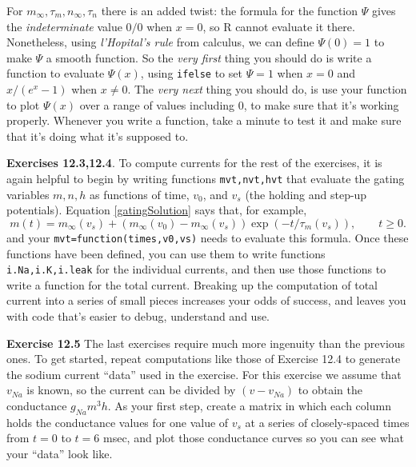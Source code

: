 \documentclass [11pt]{article}
\newcommand{\be}{\begin{equation}}
\newcommand{\ee}{\end{equation}}
\newcounter{exercise}
\numberwithin{exercise}{section}
\def\R{R }
\begin{document}
For $m_\infty,\tau_m,n_\infty,\tau_n$ there is an added twist: 
the formula for the function $\Psi$ gives the  
{\it indeterminate} value $0/0$ when $x=0$, so \R cannot evaluate
it there. Nonetheless, using {\it l'Hopital's rule} from calculus, we can
define $\Psi(0) = 1$ to make $\Psi$ a smooth function. So the \textit{very first}
thing you should do is write a function to evaluate $\Psi(x)$, using 
\texttt{ifelse} to set $\Psi=1$ when $x=0$ and $x/(e^x-1)$ when $x \ne 0$.  
The \textit{very next} thing you should do, is use your function to plot 
$\Psi(x)$ over a range of values including 0, to make sure that it's working
properly. Whenever you write a function, take a minute to test it and make
sure that it's doing what it's supposed to. 

\textbf{Exercises 12.3,12.4}. To compute currents for the rest of the exercises,
it is again helpful to begin by writing functions \texttt{mvt,nvt,hvt} that
evaluate the gating variables $m,n,h$ as functions of time, $v_0$, and $v_s$ (the
holding and step-up potentials). Equation \eqref{gatingSolution}
says that, for example, 
\be
m(t)=m_{\infty}(v_s) + (m_{\infty}(v_0)-m_{\infty}(v_s))\exp(-t/\tau_m(v_s)), \qquad t \ge 0. 
\ee
and your \texttt{mvt=function(times,v0,vs)} needs to evaluate this formula. 
Once these functions have been defined, you can use them to write functions 
\texttt{i.Na,i.K,i.leak} for the individual currents, and then use those functions 
to write a function for the total current. Breaking up the computation of total 
current into a series of small pieces increases your odds of success, and leaves you with code 
that's easier to debug, understand and use.  

\textbf{Exercise 12.5} The last exercises require much more ingenuity than the previous ones. 
To get started, repeat computations like those of Exercise 12.4 to generate the sodium 
current ``data'' used in the exercise. For this exercise we assume that $v_{Na}$ is known,
so the current can be divided by $(v-v_{Na})$ to obtain the conductance $g_{Na}m^3 h$. 
As your first step, create a matrix in which each column holds the conductance values
for one value of $v_s$ at a series of closely-spaced times from $t=0$ to $t=6$ msec,
and plot those conductance curves so you can see what your ``data'' look like.   
\end{document}
